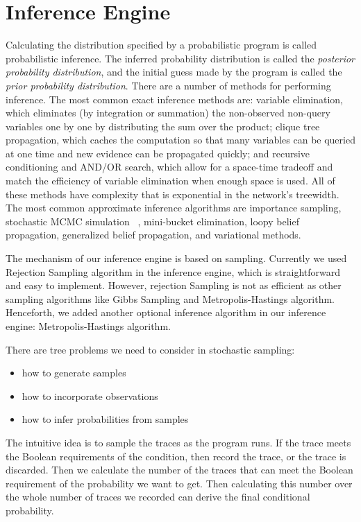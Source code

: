 \section{Inference Engine}
\label{sec:infer}
Calculating the distribution specified by a probabilistic program is called probabilistic inference. The inferred probability distribution is called the \textit{posterior probability distribution}, and the initial guess made by the program is called the \textit{prior probability distribution}. There are a number of methods for performing inference. The most common exact inference methods are: variable elimination, which eliminates (by integration or summation) the non-observed non-query variables one by one by distributing the sum over the product; clique tree propagation, which caches the computation so that many variables can be queried at one time and new evidence can be propagated quickly; and recursive conditioning and AND/OR search, which allow for a space-time tradeoff and match the efficiency of variable elimination when enough space is used. All of these methods have complexity that is exponential in the network's treewidth. The most common approximate inference algorithms are importance sampling, stochastic MCMC simulation ~\cite{mcmc}, mini-bucket elimination, loopy belief propagation, generalized belief propagation, and variational methods.

The mechanism of our inference engine is based on sampling. Currently we used Rejection Sampling algorithm in the inference engine, which is straightforward and easy to implement. However, rejection Sampling is not as efficient as other sampling algorithms like Gibbs Sampling and Metropolis-Hastings algorithm. Henceforth, we added another optional inference algorithm in our inference engine: Metropolis-Hastings algorithm. 

There are tree problems we need to consider in stochastic sampling:
\begin{itemize}
  \item how to generate samples
  \item how to incorporate observations
  \item how to infer probabilities from samples
\end{itemize}
The intuitive idea is to sample the traces as the program runs. If the trace meets the Boolean requirements of the condition, then record the trace, or the trace is discarded. Then we calculate the number of the traces that can meet the Boolean requirement of the probability we want to get. Then calculating this number over the whole number of traces we recorded can derive the final conditional probability.

